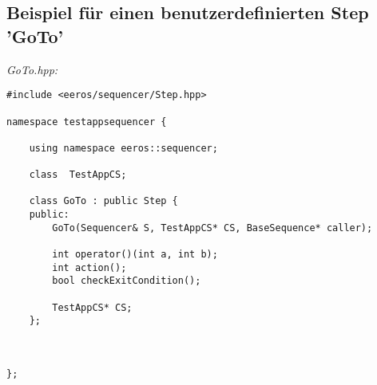 \subsection{Beispiel für einen benutzerdefinierten Step 'GoTo'}

\textit{GoTo.hpp:}\
\begin{lstlisting}
#include <eeros/sequencer/Step.hpp>

namespace testappsequencer {
	
	using namespace eeros::sequencer;
	
	class  TestAppCS;
	
	class GoTo : public Step {
	public:
		GoTo(Sequencer& S, TestAppCS* CS, BaseSequence* caller);
		
		int operator()(int a, int b);
		int action();
		bool checkExitCondition();
		
		TestAppCS* CS;
	};

	
	
};
\end{lstlisting}